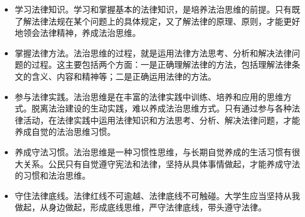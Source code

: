 \begin{enumerate}
\begin{itemize}
\item 学习法律知识。学习和掌握基本的法律知识，是培养法治思维的前提。只有既了解法律法规在某个问题上的具体规定，又了解法律的原理、原则，才能更好地领会法律精神，养成法治思维。
\item 掌握法律方法。法治思维的过程，就是运用法律方法思考、分析和解决法律问题的过程。这主要包括两个方面：一是正确理解法律的方法，包括理解法律条文的含义、内容和精神等；二是正确运用法律的方法。
\item 参与法律实践。法治思维是在丰富的法律实践中训练、培养和应用的思维方式。脱离法治建设的生动实践，难以养成法治思维方式。只有通过参与各种法律活动，在法律实践中运用法律知识和方法思考、分析、解决法律问题，才能养成自觉的法治思维习惯。
\item 养成守法习惯。法治思维是一种习惯性思维，与长期自觉养成的生活习惯有很大关系。公民只有自觉遵守宪法和法律，坚持从具体事情做起，才能养成守法的习惯和法治思维。
\item 守住法律底线。法律红线不可逾越、法律底线不可触碰。大学生应当坚持从我做起，从身边做起，形成底线思维，严守法律底线，带头遵守法律。
\end{itemize}
\end{enumerate}
